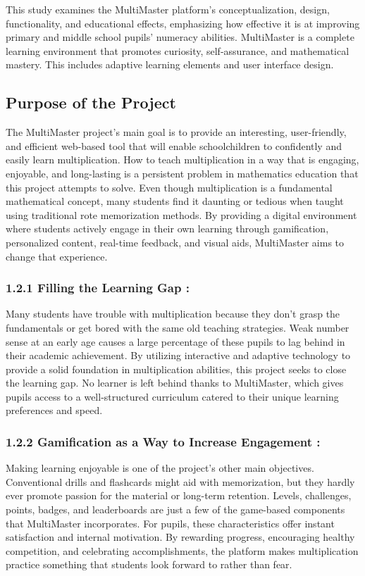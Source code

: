 \documentclass[BTech]{audiss}
\begin{document}
This study examines the MultiMaster platform's conceptualization, design, functionality, and educational effects, emphasizing how effective it is at improving primary and middle school pupils' numeracy abilities. MultiMaster is a complete learning environment that promotes curiosity, self-assurance, and mathematical mastery. This includes adaptive learning elements and user interface design.

\subsection{Purpose of the Project}
The MultiMaster project's main goal is to provide an interesting, user-friendly, and efficient web-based tool that will enable schoolchildren to confidently and easily learn multiplication. How to teach multiplication in a way that is engaging, enjoyable, and long-lasting is a persistent problem in mathematics education that this project attempts to solve. Even though multiplication is a fundamental mathematical concept, many students find it daunting or tedious when taught using traditional rote memorization methods. By providing a digital environment where students actively engage in their own learning through gamification, personalized content, real-time feedback, and visual aids, MultiMaster aims to change that experience.
\subsubsection{1.2.1 Filling the Learning Gap :}
Many students have trouble with multiplication because they don't grasp the fundamentals or get bored with the same old teaching strategies. Weak number sense at an early age causes a large percentage of these pupils to lag behind in their academic achievement. By utilizing interactive and adaptive technology to provide a solid foundation in multiplication abilities, this project seeks to close the learning gap. No learner is left behind thanks to MultiMaster, which gives pupils access to a well-structured curriculum catered to their unique learning preferences and speed.

\subsubsection{1.2.2 Gamification as a Way to Increase Engagement :}
Making learning enjoyable is one of the project's other main objectives. Conventional drills and flashcards might aid with memorization, but they hardly ever promote passion for the material or long-term retention. Levels, challenges, points, badges, and leaderboards are just a few of the game-based components that MultiMaster incorporates. For pupils, these characteristics offer instant satisfaction and internal motivation. By rewarding progress, encouraging healthy competition, and celebrating accomplishments, the platform makes multiplication practice something that students look forward to rather than fear.
\end{document}
